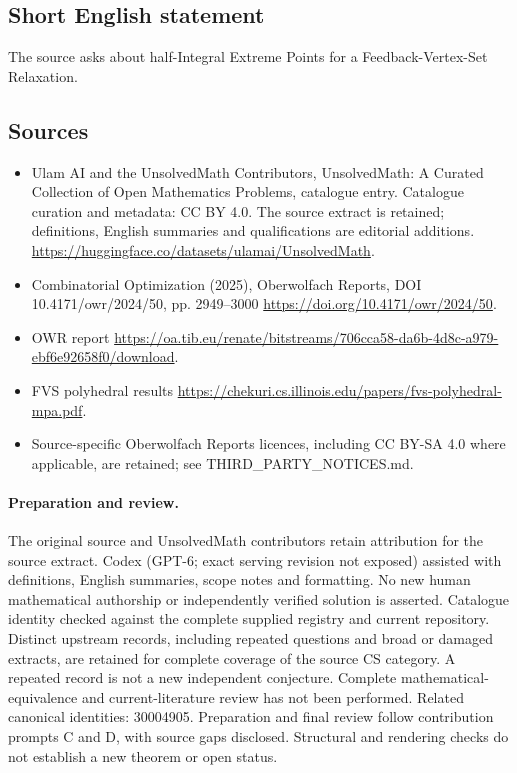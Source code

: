 \documentclass[11pt]{article}
\begin{document}
\subsection{Short English statement}
The source asks about half-Integral Extreme Points for a Feedback-Vertex-Set Relaxation.
\subsection{Sources}
\begin{itemize}
\item[\hypertarget{source:statement:1}{S1}] Ulam AI and the UnsolvedMath Contributors, UnsolvedMath: A Curated Collection of Open Mathematics Problems, catalogue entry. Catalogue curation and metadata: CC BY 4.0. The source extract is retained; definitions, English summaries and qualifications are editorial additions.
\url{https://huggingface.co/datasets/ulamai/UnsolvedMath}.
\item[\hypertarget{source:statement:2}{S2}] Combinatorial Optimization (2025), Oberwolfach Reports, DOI 10.4171/owr/2024/50, pp. 2949--3000
\url{https://doi.org/10.4171/owr/2024/50}.
\item[\hypertarget{source:statement:3}{S3}] OWR report
\url{https://oa.tib.eu/renate/bitstreams/706cca58-da6b-4d8c-a979-ebf6e92658f0/download}.
\item[\hypertarget{source:statement:4}{S4}] FVS polyhedral results
\url{https://chekuri.cs.illinois.edu/papers/fvs-polyhedral-mpa.pdf}.
\item Source-specific Oberwolfach Reports licences, including CC BY-SA 4.0 where applicable, are retained; see THIRD\_PARTY\_NOTICES.md.
\end{itemize}
\paragraph{Preparation and review.}
The original source and UnsolvedMath contributors retain attribution for the source extract. Codex (GPT-6; exact serving revision not exposed) assisted with definitions, English summaries, scope notes and formatting. No new human mathematical authorship or independently verified solution is asserted. Catalogue identity checked against the complete supplied registry and current repository. Distinct upstream records, including repeated questions and broad or damaged extracts, are retained for complete coverage of the source CS category. A repeated record is not a new independent conjecture. Complete mathematical-equivalence and current-literature review has not been performed. Related canonical identities: 30004905. Preparation and final review follow contribution prompts C and D, with source gaps disclosed. Structural and rendering checks do not establish a new theorem or open status.
\label{end:statement}
\end{document}
